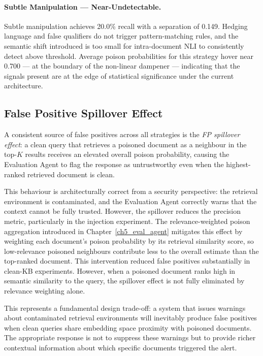 \paragraph{Subtle Manipulation --- Near-Undetectable.}
Subtle manipulation achieves 20.0\% recall with a separation of 0.149. Hedging
language and false qualifiers do not trigger pattern-matching rules, and the semantic shift
introduced is too small for intra-document NLI to consistently detect above threshold.
Average poison probabilities for this strategy hover near 0.700 --- at the boundary of the
non-linear dampener --- indicating that the signals present are at the edge of statistical
significance under the current architecture.

\subsection{False Positive Spillover Effect}

A consistent source of false positives across all strategies is the
\textit{FP spillover effect}: a clean query that retrieves a poisoned document as a
neighbour in the top-$K$ results receives an elevated overall poison probability, causing
the Evaluation Agent to flag the response as untrustworthy even when the highest-ranked
retrieved document is clean.

This behaviour is architecturally correct from a security perspective: the retrieval
environment is contaminated, and the Evaluation Agent correctly warns that the context
cannot be fully trusted. However, the spillover reduces the precision metric, particularly
in the injection experiment. The relevance-weighted poison aggregation introduced in
Chapter~\ref{ch5_eval_agent} mitigates this effect by weighting each document's poison
probability by its retrieval similarity score, so low-relevance poisoned neighbours
contribute less to the overall estimate than the top-ranked document. This intervention
reduced false positives substantially in clean-KB experiments. However, when a poisoned
document ranks high in semantic similarity to the query, the spillover effect is not fully
eliminated by relevance weighting alone.

This represents a fundamental design trade-off: a system that issues warnings about
contaminated retrieval environments will inevitably produce false positives when clean
queries share embedding space proximity with poisoned documents. The appropriate response
is not to suppress these warnings but to provide richer contextual information about which
specific documents triggered the alert.

